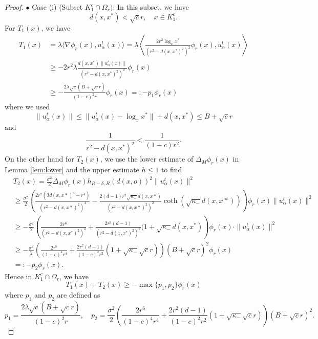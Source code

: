 \documentclass[11pt]{amsart}
\newcommand{\p}{o}%
\newcommand{\dist}{d}%
\begin{document}
\begin{proof}
\noindent $\bullet$ Case (i) (Subset $K_1^c \cap \Omega_r)$: In this subset, we have
\[
d(x,x^*)<\sqrt c r,\quad x\in K_1^c.
\]
For $T_1(x)$, we have
\begin{align*}
T_1(x)  & =  \lambda   \langle  \nabla \phi_r(x), u_\alpha^t(x) \rangle = \lambda \left\langle  \frac{2r^2 \log_xx^*}{ (r^2- d(x,x^*)^2)^2} \phi_r(x), u_\alpha^t(x)\right\rangle \\
& \geq -2r^2 \lambda \frac{  d(x,x^*) \|u_\alpha^t(x)\|      } {      (r^2- d(x,x^*)^2)^2   }  \phi_r(x)   \\
& \geq -\frac{ 2\lambda\sqrt c (B+\sqrt cr)}{(1-c)^2r} \phi_r(x) =: -p_1 \phi_r(x)
\end{align*}
where we used
\[
\|u_\alpha^t(x) \| \leq \| u_\alpha^t(x) - \log_xx^*\| + d(x,x^*) \leq B + \sqrt cr
\]
and
\[
\frac{1}{ r^2- d(x,x^*)^2  } <\frac{1}{(1-c)r^2}.
\]
On the other hand for $T_2(x)$,  we use the lower estimate of $\Delta_M \phi_r(x)$ in Lemma \ref{lem:lower} and the upper estimate  $h\leq1$ to find
\begin{align*}
&T_2(x)  = \frac{\sigma^2}{2}\Delta_M \phi_r(x)  h_{R-\delta,R}\left(\dist(x, \p)\right)^2 \|u_\alpha^t(x)\|^2 \\
& \geq \frac{\sigma^2}{2} \left(  \frac{2r^2(3d(x,x*)^4 - r^4)}{(r^2 - d(x,x*)^2)^4} - \frac{   2(d-1)r^2\sqrt{\kappa_-}d(x,x*)  }{(r^2 - d(x,x*)^2)^2}  \coth(\sqrt{\kappa_-} d(x,x*))\right) \phi_r(x) \|u_\alpha^t(x)\|^2 \\
&\geq -\frac{\sigma^2}{2}  \left(  \frac{2r^6}{ (r^2 - d(x,x^*)^2)^4} + \frac{2r^2 (d-1)}{ (r^2 - d(x,x^*)^2)^2} (1+\sqrt{\kappa_-}d(x,x^*)     \right) \phi_r(x) \cdot   \|u_\alpha^t(x)\|^2 \\
& \geq -\frac{\sigma^2}{2} \left(   \frac{2r^6}{(1-c)^4r^4}  + \frac{2r^2(d-1)}{(1-c)^2 r^2}(1+\sqrt{\kappa_-}\sqrt cr)     \right)   (B+\sqrt cr)^2 \phi_r(x) \\
& = : -p_2\phi_r(x).
\end{align*}
Hence in $K_1^c \cap \Omega_r$, we have
\[
T_1(x) + T_2(x) \geq -\max \{p_1,p_2\}\phi_r(x)
\]
where $p_1$ and $p_2$ are defined as
\begin{equation} \label{p1p2}
p_1= \frac{ 2\lambda\sqrt c (B+\sqrt cr)}{(1-c)^2r},\quad p_2 = \frac{\sigma^2}{2} \left(   \frac{2r^6}{(1-c)^4r^4}  + \frac{2r^2(d-1)}{(1-c)^2 r^2}(1+\sqrt{\kappa_-}\sqrt cr)     \right)   (B+\sqrt cr)^2 .
\end{equation}

\vspace{0.3cm}



\end{proof}
\end{document}
